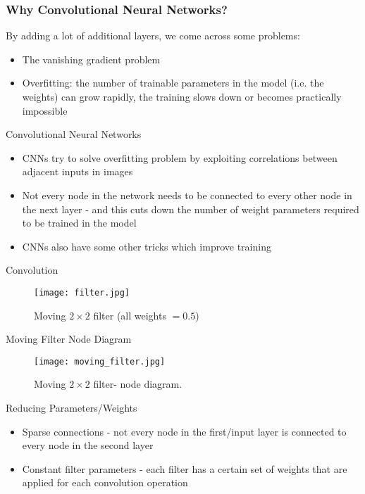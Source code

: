 \documentclass[14 pt]{beamer}
\let\olditem\item
\renewcommand{\item}{\olditem\vspace{4pt}}
\begin{document}
\begin{frame}
  \frametitle{Why Convolutional Neural Networks?}
  By adding a lot of additional layers, we come across some problems:
  \begin{itemize}
  \item The vanishing gradient problem 
  \item Overfitting: the number of trainable parameters in the
    model (i.e. the weights) can grow rapidly,  the training
    slows down or becomes practically impossible
  \end{itemize}
\end{frame}

\begin{frame}{Convolutional Neural Networks}
  \begin{itemize}
  \item CNNs try to solve overfitting problem by
    exploiting correlations between adjacent inputs in images
  \item Not every node in the network needs to be connected to every other
    node in the next layer - and this cuts down the number of weight
    parameters required to be trained in the model
  \item CNNs also have some other tricks which improve training
  \end{itemize}
\end{frame}

\begin{frame}{Convolution}
  \begin{figure}
     \texttt{[image: filter.jpg]}
     \caption{Moving $2\times 2$ filter (all weights $= 0.5$)}
   \end{figure}
 \end{frame}

\begin{frame}{Moving Filter Node Diagram}
  \begin{figure}
     \texttt{[image: moving\_filter.jpg]}
     \caption{Moving $2\times 2$ filter- node diagram.}
   \end{figure}
 \end{frame}

 \begin{frame}{Reducing Parameters/Weights}
   \begin{itemize}
   \item Sparse connections - not every node in the first/input layer is
     connected to every node in the second layer
   \item Constant filter parameters - each filter has a certain set of
     weights that are applied for each convolution operation
   \end{itemize}
 \end{frame}
\end{document}
